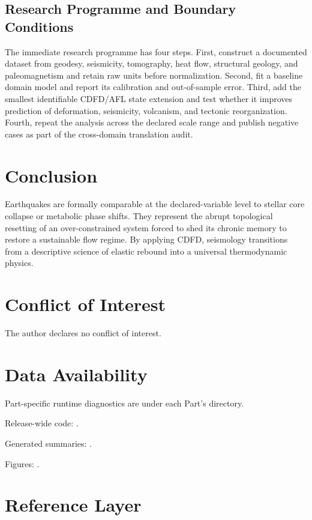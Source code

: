 \documentclass[11pt,a4paper]{article}
\begin{document}
\subsection{Research Programme and Boundary Conditions}

The immediate research programme has four steps. First, construct a documented
dataset from geodesy, seismicity, tomography, heat flow, structural geology, and paleomagnetism and retain raw units before normalization.
Second, fit a baseline domain model and report its calibration and out-of-sample
error. Third, add the smallest identifiable CDFD/AFL state extension and test
whether it improves prediction of deformation, seismicity, volcanism, and tectonic reorganization. Fourth, repeat the
analysis across the declared scale range and publish negative cases as part of
the cross-domain translation audit.


\section{Conclusion}
Earthquakes are formally comparable at the declared-variable level to stellar core collapse or metabolic phase shifts. They represent the abrupt topological resetting of an over-constrained system forced to shed its chronic memory to restore a sustainable flow regime. By applying CDFD, seismology transitions from a descriptive science of elastic rebound into a universal thermodynamic physics.
\section*{Conflict of Interest} The author declares no conflict of interest.
\section*{Data Availability}
Part-specific runtime diagnostics are under each Part's  directory.

Release-wide code: .

Generated summaries: .

Figures: .


\section{Reference Layer}


\end{document}
